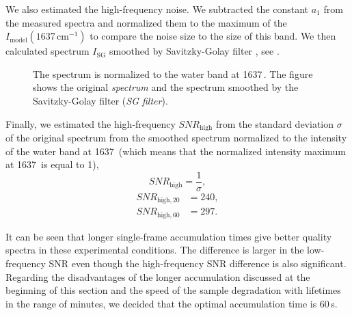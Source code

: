 We also estimated the high-frequency noise.
We subtracted the constant $a_1$ from the measured spectra and normalized them
to the maximum of the $I_\text{model}(1637\,\text{cm}^{-1})$ to compare the
noise size to the size of this band.
We then calculated spectrum $I_\text{SG}$ smoothed by Savitzky-Golay filter
\parencite{Savitzky1964},
see
.

\begin{figure}
	\centering
	
	\caption[%
		Signal-to-noise ratio calculation using standard deviation from the
	  spectrum smoothed by the Savitzky-Golay filter.
	]{%
		The spectrum is normalized to the water band at 1637\,\icm{}.
		The figure shows the original \emph{spectrum} and the spectrum smoothed by
		the Savitzky-Golay filter (\emph{SG filter}).
	}
	\label{\figlabel{accum_length:sn_ratio_sg}}
\end{figure}

Finally, we estimated the high-frequency $SNR_\text{high}$ from the standard
deviation $\sigma$ of the original spectrum from the smoothed spectrum
normalized to the intensity of the water band at 1637\,\icm{} (which means that
the normalized intensity maximum at 1637\,\icm{} is equal to 1),
\begin{equation*}
	SNR_\text{high} = \frac{1}{\sigma},
\end{equation*}
\begin{align*}
	SNR_{\text{high},20} &= 240, \\
	SNR_{\text{high},60} &= 297.
\end{align*}

It can be seen that longer single-frame accumulation times give better quality
spectra in these experimental conditions.
The difference is larger in the low-frequency SNR even though the
high-frequency SNR difference is also significant.
Regarding the disadvantages of the
longer accumulation discussed at the beginning of this section and the speed of
the sample degradation with lifetimes in the range of minutes, we decided that
the optimal accumulation time is 60\,s.
